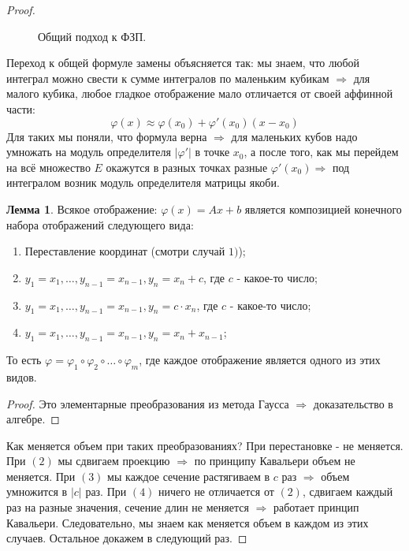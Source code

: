 \documentclass[12pt]{article}
\theoremstyle{definition}
\newtheorem{lemma}{Лемма}
\begin{document}
\begin{proof}
\begin{figure}[H]
		\caption{Общий подход к ФЗП.}
		\label{6_4}
	\end{figure}
	Переход к общей формуле замены объясняется так: мы знаем, что любой интеграл можно свести к сумме интегралов по маленьким кубикам $\Rightarrow$ для малого кубика, любое гладкое отображение мало отличается от своей аффинной части:
	$$
		\varphi(x) \approx \varphi(x_0) + \varphi'(x_0)(x - x_0)
	$$
	Для таких мы поняли, что формула верна $\Rightarrow$ для маленьких кубов надо умножать на модуль определителя $|\varphi'|$ в точке $x_0$, а после того, как мы перейдем на всё множество $E$ окажутся в разных точках разные $\varphi'(x_0) \Rightarrow$ под интегралом возник модуль определителя матрицы якоби.
	
	\begin{lemma}
		Всякое отображение: $\varphi(x) = Ax + b$ является композицией конечного набора отображений следующего вида:\hfill
		\begin{enumerate}[label=(\arabic*)]
			\item Переставление координат (смотри случай $1)$);
			\item $y_1 = x_1, \dotsc , y_{n-1} = x_{n-1}, y_n = x_n + c$, где $c$ - какое-то число;
			\item $y_1 = x_1, \dotsc , y_{n-1} = x_{n-1}, y_n = c{\cdot}x_n$, где $c$ - какое-то число;
			\item $y_1 = x_1, \dotsc , y_{n-1} = x_{n-1}, y_n = x_n + x_{n-1}$;
		\end{enumerate}
		То есть $\varphi = \varphi_1 \circ \varphi_2 \circ \dotsc \circ \varphi_m$, где каждое отображение является одного из этих видов.
	\end{lemma}
	\begin{proof}
		Это элементарные преобразования из метода Гаусса $\Rightarrow$ доказательство в алгебре.
	\end{proof}
	Как меняется объем при таких преобразованиях? При перестановке - не меняется. При $(2)$ мы сдвигаем проекцию $\Rightarrow$ по принципу Кавальери объем не меняется. При $(3)$ мы каждое сечение растягиваем в $c$ раз $\Rightarrow$ объем умножится в $|c|$ раз. При $(4)$ ничего не отличается от $(2)$, сдвигаем каждый раз на разные значения, сечение длин не меняется $\Rightarrow$ работает принцип Кавальери. Следовательно, мы знаем как меняется объем в каждом из этих случаев. Остальное докажем в следующий раз.
\end{proof}
\end{document}
